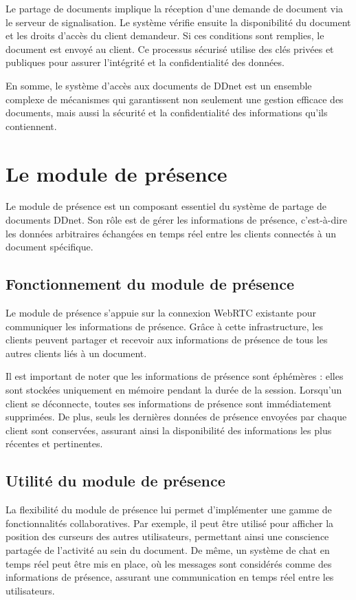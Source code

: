 Le partage de documents implique la réception d'une demande de document via le serveur de signalisation. Le système vérifie ensuite la disponibilité du document et les droits d'accès du client demandeur. Si ces conditions sont remplies, le document est envoyé au client. Ce processus sécurisé utilise des clés privées et publiques pour assurer l'intégrité et la confidentialité des données.

En somme, le système d'accès aux documents de \gls{DDnet} est un ensemble complexe de mécanismes qui garantissent non seulement une gestion efficace des documents, mais aussi la sécurité et la confidentialité des informations qu'ils contiennent.

\section{Le module de présence}
Le module de présence est un composant essentiel du système de partage de documents \gls{DDnet}. Son rôle est de gérer les informations de présence, c'est-à-dire les données arbitraires échangées en temps réel entre les clients connectés à un document spécifique.

\subsection{Fonctionnement du module de présence}
Le module de présence s'appuie sur la connexion \gls{WebRTC} existante pour communiquer les informations de présence. Grâce à cette infrastructure, les clients peuvent partager et recevoir aux informations de présence de tous les autres clients liés à un document.

Il est important de noter que les informations de présence sont éphémères : elles sont stockées uniquement en mémoire pendant la durée de la session. Lorsqu'un client se déconnecte, toutes ses informations de présence sont immédiatement supprimées. De plus, seuls les dernières données de présence envoyées par chaque client sont conservées, assurant ainsi la disponibilité des informations les plus récentes et pertinentes.

\subsection{Utilité du module de présence}
La flexibilité du module de présence lui permet d'implémenter une gamme de fonctionnalités collaboratives. Par exemple, il peut être utilisé pour afficher la position des curseurs des autres utilisateurs, permettant ainsi une conscience partagée de l'activité au sein du document. De même, un système de chat en temps réel peut être mis en place, où les messages sont considérés comme des informations de présence, assurant une communication en temps réel entre les utilisateurs.

